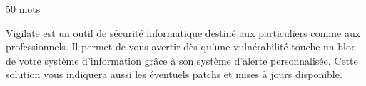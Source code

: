 \begin{flushleft} \LARGE 50 mots \\  \end{flushleft}
Vigilate est un outil de sécurité informatique destiné aux particuliers comme aux professionnels. Il permet de vous avertir dès qu’une vulnérabilité touche un bloc de votre système d’information grâce à son système d’alerte personnalisée. Cette solution vous indiquera aussi les éventuels patchs et mises à jours disponible. 